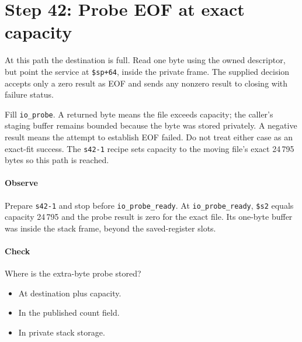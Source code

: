 \section{Step 42: Probe EOF at exact capacity}
At this path the destination is full. Read one byte using the owned
descriptor, but point the service at \texttt{\$sp+64}, inside the private
frame. The supplied decision accepts only a zero result as EOF and sends any
nonzero result to closing with failure status.

Fill \texttt{io\_probe}. A returned byte means the file exceeds capacity;
the caller's staging buffer remains bounded because the byte was stored privately.
A negative result means the attempt to establish EOF failed. Do not treat either
case as an exact-fit success. The \texttt{s42-1} recipe sets capacity to the
moving file's exact 24\,795 bytes so this path is reached.

\paragraph{Observe} Prepare \texttt{s42-1} and stop before
\texttt{io\_probe\_ready}. At \texttt{io\_probe\_ready}, \texttt{\$s2} equals capacity
24\,795 and the probe result is zero for the exact file. Its one-byte buffer
was inside the stack frame, beyond the saved-register slots.

\paragraph{Check} Where is the extra-byte probe stored?
\begin{itemize}
  \item[A.] At destination plus capacity.
  \item[B.] In the published count field.
  \item[C.] In private stack storage.
\end{itemize}
